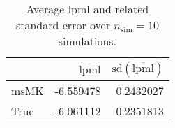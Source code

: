 \begin{table}[H]

\caption{Average lpml and related standard error over $n_{\text{sim}} = 10$ simulations.}
\centering
\begin{tabular}[t]{lrr}
\toprule
  & $\overbar{\text{lpml}}$ & $\text{sd}(\overbar{\text{lpml}})$\\
\midrule
msMK & -6.559478 & 0.2432027\\
True & -6.061112 & 0.2351813\\
\bottomrule
\end{tabular}
\end{table}